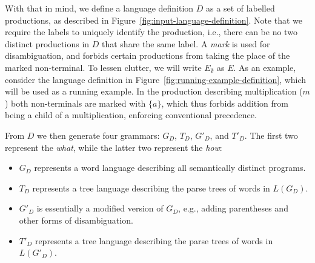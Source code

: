 \documentclass[acmsmall,review,anonymous]{acmart}\settopmatter{printfolios=true,printccs=false,printacmref=false}
\begin{document}
With that in mind, we define a language definition $D$ as a set of labelled productions, as described in Figure~\ref{fig:input-language-definition}. Note that we require the labels to uniquely identify the production, i.e., there can be no two distinct productions in $D$ that share the same label. A \emph{mark} is used for disambiguation, and forbids certain productions from taking the place of the marked non-terminal. To lessen clutter, we will write $E_\emptyset$ as $E$. As an example, consider the language definition in Figure~\ref{fig:running-example-definition}, which will be used as a running example. In the production describing multiplication ($m$) both non-terminals are marked with $\{a\}$, which thus forbids addition from being a child of a multiplication, enforcing conventional precedence.

From $D$ we then generate four grammars: $G_D$, $T_D$, $G'_D$, and $T'_D$. The first two represent the \emph{what}, while the latter two represent the \emph{how}:

\begin{itemize}
\item $G_D$ represents a word language describing all semantically distinct programs.
\item $T_D$ represents a tree language describing the parse trees of words in $L(G_D)$.
\item $G'_D$ is essentially a modified version of $G_D$, e.g., adding parentheses and other forms of disambiguation.
\item $T'_D$ represents a tree language describing the parse trees of words in $L(G'_D)$.
\end{itemize}
\end{document}
